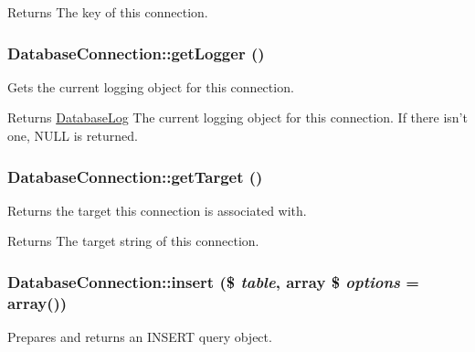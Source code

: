 \begin{DoxyReturn}{Returns}
The key of this connection. 
\end{DoxyReturn}
\hypertarget{classDatabaseConnection_a9d07ce930cfc948c56fb165494c6b076}{
\subsubsection[{getLogger}]{\setlength{\rightskip}{0pt plus 5cm}DatabaseConnection::getLogger ()}}
\label{classDatabaseConnection_a9d07ce930cfc948c56fb165494c6b076}
Gets the current logging object for this connection.

\begin{DoxyReturn}{Returns}
\hyperlink{classDatabaseLog}{DatabaseLog} The current logging object for this connection. If there isn't one, NULL is returned. 
\end{DoxyReturn}
\hypertarget{classDatabaseConnection_a82dfe273b945f88d173100f0f760efd9}{
\subsubsection[{getTarget}]{\setlength{\rightskip}{0pt plus 5cm}DatabaseConnection::getTarget ()}}
\label{classDatabaseConnection_a82dfe273b945f88d173100f0f760efd9}
Returns the target this connection is associated with.

\begin{DoxyReturn}{Returns}
The target string of this connection. 
\end{DoxyReturn}
\hypertarget{classDatabaseConnection_aa979bc386e0457a0cb989d762da5afde}{
\subsubsection[{insert}]{\setlength{\rightskip}{0pt plus 5cm}DatabaseConnection::insert (\$ {\em table}, \/  array \$ {\em options} = {\ttfamily array()})}}
\label{classDatabaseConnection_aa979bc386e0457a0cb989d762da5afde}
Prepares and returns an INSERT query object.


